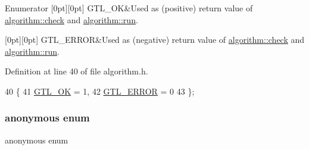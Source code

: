 \begin{DoxyEnumFields}{Enumerator}
[0pt][0pt]{}\mbox{\label{classalgorithm_af1a0078e153aa99c24f9bdf0d97f6710a5114c20e4a96a76b5de9f28bf15e282b}} 
G\+T\+L\+\_\+\+OK&Used as (positive) return value of \mbox{\hyperlink{classalgorithm_a76361fb03ad1cf643affc51821e43bed}{algorithm\+::check}} and \mbox{\hyperlink{classalgorithm_a734b189509a8d6b56b65f8ff772d43ca}{algorithm\+::run}}. \\
\hline

[0pt][0pt]{}\mbox{\label{classalgorithm_af1a0078e153aa99c24f9bdf0d97f6710a6fcf574690bbd6cf710837a169510dd7}} 
G\+T\+L\+\_\+\+E\+R\+R\+OR&Used as (negative) return value of \mbox{\hyperlink{classalgorithm_a76361fb03ad1cf643affc51821e43bed}{algorithm\+::check}} and \mbox{\hyperlink{classalgorithm_a734b189509a8d6b56b65f8ff772d43ca}{algorithm\+::run}}. \\
\hline

\end{DoxyEnumFields}


Definition at line 40 of file algorithm.\+h.


\begin{DoxyCode}
40          \{
41     \mbox{\hyperlink{classalgorithm_af1a0078e153aa99c24f9bdf0d97f6710a5114c20e4a96a76b5de9f28bf15e282b}{GTL\_OK}} = 1,
42     \mbox{\hyperlink{classalgorithm_af1a0078e153aa99c24f9bdf0d97f6710a6fcf574690bbd6cf710837a169510dd7}{GTL\_ERROR}} = 0
43     \};
\end{DoxyCode}
\mbox{\label{classmaxflow__sap_ac30ce6f46eb2dc97b557297c48989f8e}} 
\subsubsection{\texorpdfstring{anonymous enum}{anonymous enum}}
{\footnotesize\ttfamily anonymous enum\hspace{0.3cm}{\ttfamily [protected]}}

